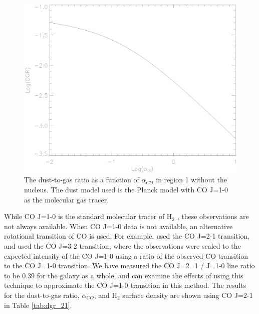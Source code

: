 \begin{figure}
  \centering
  \includegraphics[width=1.\textwidth]{dgr_imgs/region_1-3_aco_dgr.eps}
  \caption[Mean Dust-to-Gas Ratio vs $\alpha_{CO}$]{The dust-to-gas ratio as a function of $\alpha_{CO}$ in region 1 without the nucleus.  The dust model used is the Planck model with CO J=1-0 as the molecular gas tracer.}
  \label{fig:aco_dgr}
\end{figure}

While CO J=1-0 is the standard molecular tracer of H$_2$ \citep{bolatto2013}, these observations are not always available.  When CO J=1-0 data is not available, an alternative rotational transition of CO is used.  For example, \cite{sandstrom2013} used the CO J=2-1 transition, and \cite{warren2010} used the CO J=3-2 transition, where the observations were scaled to the expected intensity of the CO J=1-0 using a ratio of the observed CO transition to the CO J=1-0 transition.  We have measured the CO J=2=1 / J=1-0 line ratio to be 0.39 for the galaxy as a whole, and can examine the effects of using this technique to approximate the CO J=1-0 transition in this method.  The results for the dust-to-gas ratio, $\alpha_{CO}$, and H$_2$ surface density are shown using CO J=2-1 in Table \ref{tab:dgr_21}.

